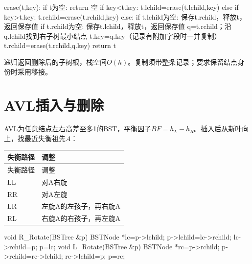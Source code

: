 \par\smallskip\noindent\begin{minipage}{\linewidth}
\begin{codeblock}[language={}]
erase(t,key):
    if t为空: return 空
    if key<t.key: t.lchild=erase(t.lchild,key)
    else if key>t.key: t.rchild=erase(t.rchild,key)
    else:
        if t.lchild为空: 保存t.rchild，释放t，返回保存值
        if t.rchild为空: 保存t.lchild，释放t，返回保存值
        q=t.rchild；沿q.lchild找到右子树最小结点
        t.key=q.key（记录有附加字段时一并复制）
        t.rchild=erase(t.rchild,q.key)
    return t
\end{codeblock}
\end{minipage}\par\smallskip

递归返回删除后的子树根，栈空间\(O(h)\)。复制须带整条记录；要求保留结点身份时采用移接。

\section{AVL插入与删除}\label{DS07-avl}

AVL为任意结点左右高差至多1的BST，平衡因子\(BF=h_L-h_R\)。插入后从新叶向上，找最近失衡祖先\(A\)：

\par\smallskip
{\fontsize{9.3}{12}\selectfont\setlength{\tabcolsep}{2.5pt}\setlength{\LTleft}{0pt}\setlength{\LTright}{0pt}
\begin{longtable}{@{}>{\raggedright\arraybackslash}p{}>{\raggedright\arraybackslash}p{}@{}}
\toprule
失衡路径 & 调整 \\

\midrule\endfirsthead\toprule
失衡路径 & 调整 \\

\midrule\endhead\bottomrule\endfoot
LL & 对A右旋 \\

RR & 对A左旋 \\

LR & 左旋A的左孩子，再右旋A \\

RL & 右旋A的右孩子，再左旋A \\

\end{longtable}}
\par\smallskip

\par\smallskip\noindent\begin{minipage}{\linewidth}
\begin{codeblock}[language={C++}]
void R_Rotate(BSTree &p) {
    BSTNode *lc=p->lchild;
    p->lchild=lc->rchild;
    lc->rchild=p;
    p=lc;
}
void L_Rotate(BSTree &p) {
    BSTNode *rc=p->rchild;
    p->rchild=rc->lchild;
    rc->lchild=p;
    p=rc;
}
\end{codeblock}
\end{minipage}\par\smallskip

